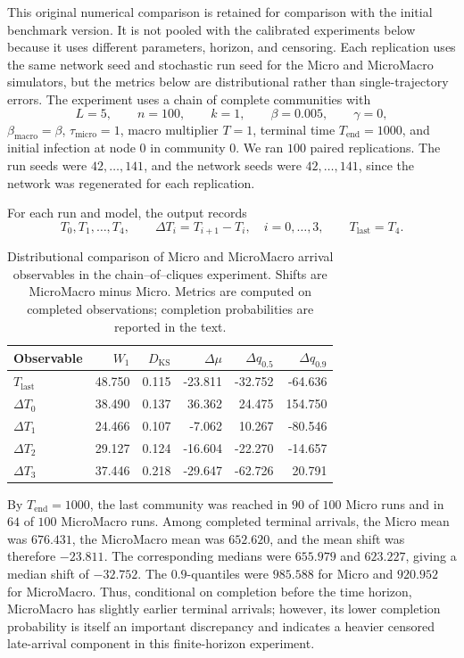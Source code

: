 \documentclass[12pt,a4paper]{article}
\begin{document}
This original numerical comparison is retained for comparison with the initial benchmark version. It is not pooled with the calibrated experiments below because it uses different parameters, horizon, and censoring. Each replication uses the same network seed and stochastic run seed for the Micro and MicroMacro simulators, but the metrics below are distributional rather than single-trajectory errors. The experiment uses a chain of complete communities with
\[
L=5,\qquad n=100,\qquad k=1,\qquad
\beta=0.005,\qquad \gamma=0,
\]
\(\beta_{\mathrm{macro}}=\beta\), \(\tau_{\mathrm{micro}}=1\), macro multiplier \(T=1\), terminal time \(T_{\mathrm{end}}=1000\), and initial infection at node \(0\) in community \(0\). We ran \(100\) paired replications. The run seeds were \(42,\ldots,141\), and the network seeds were \(42,\ldots,141\), since the network was regenerated for each replication.

For each run and model, the output records
\[
T_0,T_1,\ldots,T_4,\qquad
\Delta T_i=T_{i+1}-T_i,\quad i=0,\ldots,3,
\qquad
T_{\mathrm{last}}=T_4.
\]

\begin{table}[t]
    \centering
    \begin{tabular}{lrrrrr}
        \hline
        Observable & \(W_1\) & \(D_{\mathrm{KS}}\) & \(\Delta\mu\) & \(\Delta q_{0.5}\) & \(\Delta q_{0.9}\) \\
        \hline
        \(T_{\mathrm{last}}\) & 48.750 & 0.115 & -23.811 & -32.752 & -64.636 \\
        \(\Delta T_0\) & 38.490 & 0.137 & 36.362 & 24.475 & 154.750 \\
        \(\Delta T_1\) & 24.466 & 0.107 & -7.062 & 10.267 & -80.546 \\
        \(\Delta T_2\) & 29.127 & 0.124 & -16.604 & -22.270 & -14.657 \\
        \(\Delta T_3\) & 37.446 & 0.218 & -29.647 & -62.726 & 20.791 \\
        \hline
    \end{tabular}
    \caption{Distributional comparison of Micro and MicroMacro arrival observables in the chain--of--cliques experiment. Shifts are MicroMacro minus Micro. Metrics are computed on completed observations; completion probabilities are reported in the text.}
    \label{tab:chain_cliques_arrival_metrics}
\end{table}

By \(T_{\mathrm{end}}=1000\), the last community was reached in \(90\) of \(100\) Micro runs and in \(64\) of \(100\) MicroMacro runs. Among completed terminal arrivals, the Micro mean was \(676.431\), the MicroMacro mean was \(652.620\), and the mean shift was therefore \(-23.811\). The corresponding medians were \(655.979\) and \(623.227\), giving a median shift of \(-32.752\). The \(0.9\)-quantiles were \(985.588\) for Micro and \(920.952\) for MicroMacro. Thus, conditional on completion before the time horizon, MicroMacro has slightly earlier terminal arrivals; however, its lower completion probability is itself an important discrepancy and indicates a heavier censored late-arrival component in this finite-horizon experiment.
\end{document}
